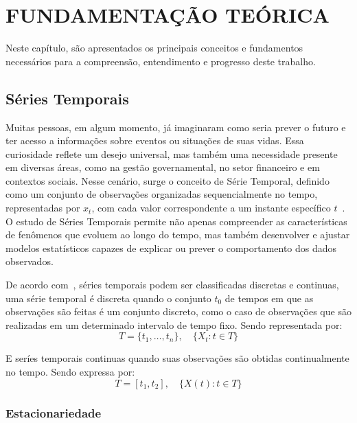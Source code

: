 \chapter{FUNDAMENTAÇÃO TEÓRICA}
Neste capítulo, são apresentados os principais conceitos e fundamentos necessários para a compreensão, 
entendimento e progresso deste trabalho.


\section{Séries Temporais}
    Muitas pessoas, em algum momento, já imaginaram como seria prever o futuro e ter acesso a informações sobre eventos 
    ou situações de suas vidas. Essa curiosidade reflete um desejo universal, mas também uma necessidade presente em 
    diversas áreas, como na gestão governamental, no setor financeiro e em contextos sociais. Nesse cenário, surge o 
    conceito de Série Temporal, definido como um conjunto de observações organizadas sequencialmente no tempo, 
    representadas por \( x_t \), com cada valor correspondente a um instante específico \(t\)~\cite{box2015}. O estudo de 
    Séries Temporais permite não apenas compreender as características de fenômenos que evoluem ao longo do tempo, mas 
    também desenvolver e ajustar modelos estatísticos capazes de explicar ou prever o comportamento dos dados 
    observados.
    
    De acordo com~\cite{brockwell2002}, séries temporais podem ser classificadas 
    discretas e continuas, uma série temporal é discreta quando o conjunto \( t_0 \) de tempos em que as observações 
    são feitas é um conjunto discreto, como o caso de observações que são realizadas em um determinado intervalo de 
    tempo fixo. Sendo representada por:
    \begin{equation}
        T = \{t_1, \dots, t_n\}, \quad \{X_t : t \in T\}
    \end{equation}
    
    
    E seríes temporais continuas quando suas observações são obtidas continualmente 
    no tempo. Sendo expressa por: 
    \begin{equation}
        T = [t_1, t_2], \quad \{X(t) : t \in T\}
    \end{equation}
        

    

    \subsection{Estacionariedade}
